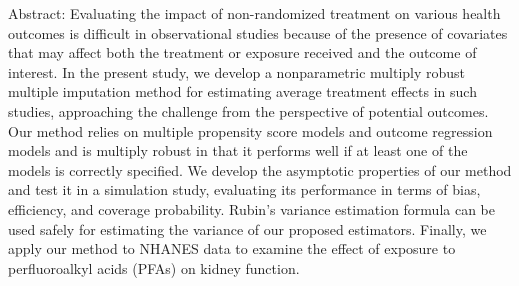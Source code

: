 \documentclass[]{article}
\begin{document}
Abstract: Evaluating the impact of non-randomized treatment on various
health outcomes is difficult in observational studies because of the
presence of covariates that may affect both the treatment or exposure
received and the outcome of interest. In the present study, we develop a
nonparametric multiply robust multiple imputation method for estimating
average treatment effects in such studies, approaching the challenge
from the perspective of potential outcomes. Our method relies on
multiple propensity score models and outcome regression models and is
multiply robust in that it performs well if at least one of the models
is correctly specified. We develop the asymptotic properties of our
method and test it in a simulation study, evaluating its performance in
terms of bias, efficiency, and coverage probability. Rubin's variance
estimation formula can be used safely for estimating the variance of our
proposed estimators. Finally, we apply our method to NHANES data to
examine the effect of exposure to perfluoroalkyl acids (PFAs) on kidney
function.
\end{document}
